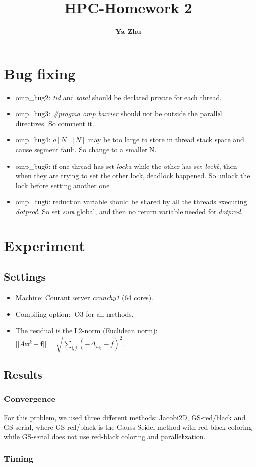 \documentclass[11pt, oneside]{article}   	%
\title{\bf HPC-Homework 2}
\author{\bf \large Ya Zhu}
\date{}							%
\begin{document}
\maketitle 
\section{Bug fixing}
\begin{itemize}
\item omp\_bug2: \emph{tid} and \emph{total} should be declared private for each thread.
\item omp\_bug3: \emph{\#pragma omp barrier} should not be outside the parallel directives. So comment it.
\item omp\_bug4: $a[N][N]$ may be too large to store in thread stack space and cause segment fault. So change to a smaller N.
\item omp\_bug5: if one thread has set \emph{locka} while the other has set \emph{lockb}, then when they are trying to set the other lock, deadlock happened. So unlock the lock before setting another one.
\item omp\_bug6: reduction variable should be shared by all the threads executing \emph{dotprod}. So set \emph{sum} global, and then no return variable needed for \emph{dotprod}.
\end{itemize}
\section{Experiment}
\subsection{Settings}
\begin{itemize}
\item Machine: Courant server \emph{crunchy1} (64 cores).
\item Compiling option: -O3 for all methods.
\item The residual is the L2-norm (Euclidean norm): $||A\boldsymbol{u}^k-\boldsymbol{f}||=\sqrt{\sum_{i,j}({-\Delta_{u_{ij}}-f})^2}$.
\end{itemize}
\subsection{Results}
\subsubsection{Convergence}
For this problem, we used three different methods: Jacobi2D, GS-red/black and GS-serial, where GS-red/black is the Gauss-Seidel method with red-black coloring while GS-serial does not use red-black coloring and parallelization. 
\subsubsection{Timing}
\end{document}
